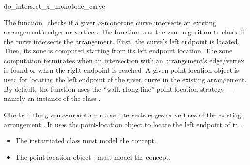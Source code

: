 \ccRefPageBegin

\begin{ccRefFunction}{do_intersect_x_monotone_curve}

\ccDefinition

The function \ccRefName\ checks if a given $x$-monotone curve
intersects an existing arrangement's edges or vertices.
The function uses the zone algorithm to check if the curve intersects
the arrangement. First, the curve's left endpoint is located. Then, 
its zone is computed starting from its left endpoint location. The
zone computation terminates when an intersection with an arrangement's
edge/vertex is found or when the right endpoint is reached. 
A given point-location object is used for locating the left endpoint 
of the given curve in the existing arrangement. By default, the function 
uses the ``walk along line'' point-location strategy --- namely an 
instance of the class 
.


Checks if the given $x$-monotone curve  intersects edges or
vertices of the existing arrangement . It uses the
point-location object  to locate the left endpoint of
 in .


\ccRequirements
\begin{itemize}
\item The instantiated  class must model the
   concept.
\item The point-location object , must model the
   concept.
\end{itemize}
			 
\end{ccRefFunction}

\ccRefPageEnd
